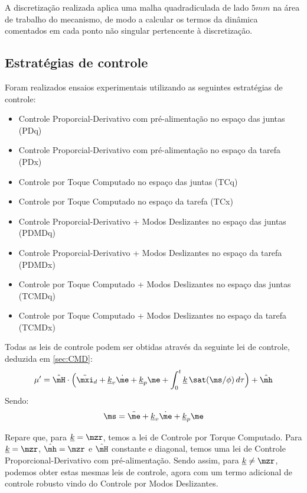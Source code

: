 \documentclass[]{politex}
\begin{document}
A discretização realizada aplica uma malha quadradiculada de lado $5mm$ na área de trabalho do mecanismo, de modo a calcular os termos da dinâmica comentados em cada ponto não singular pertencente à discretização.

\subsection{Estratégias de controle}

Foram realizados ensaios experimentais utilizando as seguintes estratégias de controle:

\begin{itemize}
\item Controle Proporcial-Derivativo com pré-alimentação no espaço das juntas (PDq)
\item Controle Proporcial-Derivativo com pré-alimentação no espaço da tarefa (PDx)
\item Controle por Toque Computado no espaço das juntas (TCq)
\item Controle por Toque Computado no espaço da tarefa (TCx)
\item Controle Proporcial-Derivativo + Modos Deslizantes no espaço das juntas (PDMDq)
\item Controle Proporcial-Derivativo + Modos Deslizantes no espaço da tarefa (PDMDx)
\item Controle por Toque Computado + Modos Deslizantes no espaço das juntas (TCMDq)
\item Controle por Toque Computado + Modos Deslizantes no espaço da tarefa (TCMDx)
\end{itemize}

Todas as leis de controle podem ser obtidas através da seguinte lei de controle, deduzida em \ref{sec:CMD}:
\begin{equation} \label{eq:LeiTCMD}
\mu' = \hat{\mH} \cdot \Big(\ddot{\mxi}_d + \underline{k}_v \dot{\me} + \underline{k}_p \me + \int_0^t \underline{k} \, \sat(\ms/\phi)\,d \tau \Big) + \hat{\mh}
\end{equation}
Sendo:
\begin{equation}
\ms = \ddot{\me} + \underline{k}_v \dot{\me} + \underline{k}_p \me
\end{equation}

Repare que, para $\underline{k} = \mzr$, temos a lei de Controle por Torque Computado. Para $\underline{k} = \mzr$, $\hat{\mh} = \mzr$ e $\hat{\mH}$ constante e diagonal, temos uma lei de Controle Proporcional-Derivativo com pré-alimentação. Sendo assim, para $\underline{k} \neq \mzr$, podemos obter estas mesmas leis de controle, agora com um termo adicional de controle robusto vindo do Controle por Modos Deslizantes.
\end{document}
